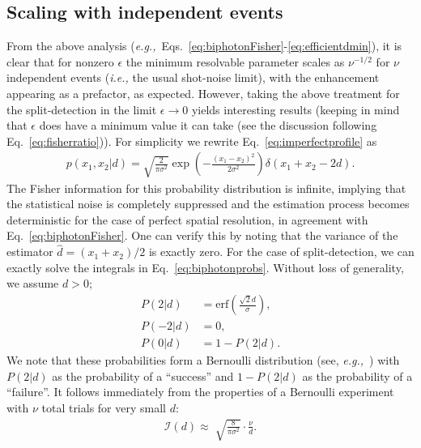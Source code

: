 \subsection{Scaling with independent events}\label{sub:scaling}
From the above analysis (\emph{e.g.,}~Eqs.~\eqref{eq:biphotonFisher}-\eqref{eq:efficientdmin}), it is clear that for nonzero $\epsilon$ the minimum resolvable parameter scales as $\nu^{-1/2}$ for $\nu$ independent events (\emph{i.e.,} the usual shot-noise limit), with the enhancement appearing as a prefactor, as expected.  
However, taking the above treatment for the split-detection in the limit $\epsilon \rightarrow 0$ yields interesting results (keeping in mind that $\epsilon$ does have a minimum value it can take (see the discussion following Eq.~\eqref{eq:fisherratio})).  
For simplicity we rewrite Eq.~\eqref{eq:imperfectprofile} as 
\begin{align}
	p(x_1,x_2|d) = \sqrt{\frac{2}{\pi\sigma^2}}\exp\left(-\frac{(x_1 - x_2)^2}{2\sigma^2}\right)\delta(x_1 + x_2 - 2d).
\end{align}
The Fisher information for this probability distribution is infinite, implying that the statistical noise is completely suppressed and the estimation process becomes deterministic for the case of perfect spatial resolution, in agreement with Eq.~\eqref{eq:biphotonFisher}.
One can verify this by noting that the variance of the estimator $\hat{d} = (x_1 + x_2)/2$ is exactly zero. 
For the case of split-detection, we can exactly solve the integrals in Eq.~\eqref{eq:biphotonprobs}.  
Without loss of generality, we assume $d>0$;
\begin{align}\label{eq:perfectprobs}
\nonumber	P(2|d) &= \text{erf}\left(\frac{\sqrt{2} d}{\sigma}\right), \\
\nonumber	P(-2|d) &=0, \\
			P(0|d) &= 1 - P(2|d).
\end{align}
We note that these probabilities form a Bernoulli distribution (see, \emph{e.g.,}~\cite{Cahill2013, Larsen2001}) with $P(2|d)$ as the probability of a ``success'' and $1 - P(2|d)$ as the probability of a ``failure''.  
It follows immediately from the properties of a Bernoulli experiment with $\nu$ total trials for very small $d$:
\begin{align}\label{eq:perfectfisher}
	\mathcal{I}(d) \approx \sqrt[]{\frac{8}{\pi \sigma^2}} \cdot \frac{\nu}{d}.
\end{align}


